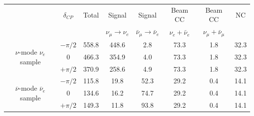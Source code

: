 \documentclass[a4 paper,12pt]{report}%
\begin{document}
\begin{center}
\label{tab:t2knue}
\begin{tabular}{|c| c| c| c| c| c| c| c|}
\hline
 &$\delta_{CP}$ &  Total & Signal & Signal  &  Beam CC   & Beam CC  & NC \\ 
 & &        & $\nu_\mu \rightarrow \nu_e$&$\bar{\nu}_\mu \rightarrow \bar{\nu}_e$ &   $\nu_e + \bar{\nu}_e$ &  $\nu_\mu + \bar{\nu}_\mu$ &  \\
 \hline  
\multirow{3}{*}{ $\nu$-mode $\nu_e$ sample}& $-\pi/2$ &  558.8 & 448.6 & 2.8 & 73.3 & 1.8 & 32.3 \\

 & 	0	 & 	466.3 & 354.9 	& 4.0		& 73.3	& 1.8		& 32.3\\ 
 
 & $+\pi/2$ & 370.9 & 258.6	& 4.9		& 73.3	& 1.8		& 32.3\\ 
 \hline
 
 \multirow{3}{*}{ $\overline{\nu}$-mode $\overline{\nu}_e$ sample}& $-\pi/2$ & 115.8  & 19.8 & 52.3 & 29.2 & 0.4 & 14.1 \\

 & 	0	 & 134.6	 & 16.2 	& 74.7		& 29.2	& 0.4		&14.1\\ 
 
 & $+\pi/2$ & 149.3	 & 11.8	& 93.8		& 29.2	& 0.4		& 14.1\\ 
 \hline
\end{tabular} 
\end{center}
\end{document}

